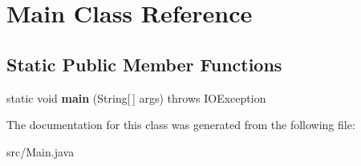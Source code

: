 \hypertarget{classMain}{}\section{Main Class Reference}
\label{classMain}
\subsection*{Static Public Member Functions}
\begin{DoxyCompactItemize}
\item 
static void {\bfseries main} (String\mbox{[}$\,$\mbox{]} args)  throws I\+O\+Exception \hypertarget{classMain_a8a5d0f827edddff706cc0e6740d0579a}{}\label{classMain_a8a5d0f827edddff706cc0e6740d0579a}

\end{DoxyCompactItemize}


The documentation for this class was generated from the following file\+:\begin{DoxyCompactItemize}
\item 
src/Main.\+java\end{DoxyCompactItemize}

